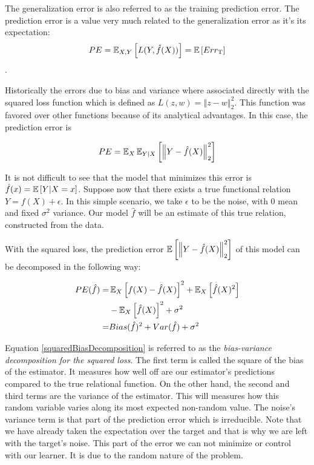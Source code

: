 The generalization error is also referred to as the training prediction error. The prediction error is a value very much related to the generalization error as it's its expectation:
$$ PE = \operatorname{\mathbb{E}}_{X,Y} \left[ L(Y,\hat{f}(X))\right] =  \operatorname{\mathbb{E}} \left[ Err_{\mathrm{T}}  \right]$$.

Historically the errors due to bias and variance where associated directly with the squared loss function which is defined as $L(z,w) = \left\Vert z-w \right\Vert^2_2$. This function was favored over other functions because of its analytical advantages.  In this case, the prediction error is

\begin{equation}\label{squaredPE}
PE = \operatorname{\mathbb{E}}_X \operatorname{\mathbb{E}}_{Y|X} \left[ \left\Vert  Y - \hat{f}(X)  \right\Vert_2^2 \right]
\end{equation}

It is not difficult to see that the model that minimizes this error is $\hat{f}(x) = \operatorname{\mathbb{E}} \left[ Y | X=x \right] $. Suppose now that there exists a true functional relation $Y = f(X) + \epsilon$.
In this simple scenario, we take $\epsilon$ to be the noise, with $0$ mean and fixed $\sigma^2$ variance. Our model $\hat{f}$ will be an estimate of this true relation, constructed from the data.

With the squared loss, the prediction error $\operatorname{\mathbb{E}} \left[ \left\Vert Y  - \hat{f}(X) \right\Vert_2^2 \right]$ of this model can be decomposed in the following way:

\begin{equation}\label{squaredBiasDecomposition}
\begin{split}
PE( \hat{f} ) = & \operatorname{\mathbb{E}}_X \left[   f(X)  - \hat{f}(X) \right]^2 +  \operatorname{\mathbb{E}}_X \left[ \hat{f}(X)^2  \right] \\
& - \operatorname{\mathbb{E}}_X \left[ \hat{f}(X)  \right]^2  + \sigma^2 \\
= & Bias(\hat{f})^2 + Var(\hat{f}) + \sigma^2
\end{split}
\end{equation}

Equation \ref{squaredBiasDecomposition} is referred to as the \textit{bias-variance decomposition for the squared loss}. The first term is called the square of the bias of the estimator. It measures how well off are our estimator's predictions compared to the true relational function. On the other hand, the second and third terms are the variance of the estimator. This will measures how this random variable varies along its most expected non-random value. The noise's variance term is that part of the prediction error which is irreducible. Note that we have already taken the expectation over the target and that is why we are left with the target's noise. This part of the error we can not minimize or control with our learner. It is due to the random nature of the problem.


